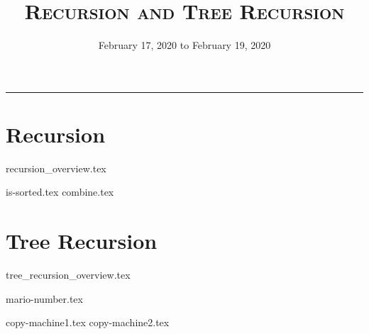 \documentclass{exam}
\title{\textsc{Recursion and Tree Recursion}}
\date{February 17, 2020 to February 19, 2020}
\begin{document}
\maketitle
\rule{\textwidth}{0.15em}
\fontsize{12}{15}\selectfont


\section{Recursion}
{recursion_overview.tex}
\begin{questions}
{is-sorted.tex}
{combine.tex}
\end{questions}

\pagebreak

\section{Tree Recursion}
{tree_recursion_overview.tex}
\pagebreak
\begin{questions}
{mario-number.tex}

{copy-machine1.tex}
{copy-machine2.tex}
\end{questions}
\end{document}
